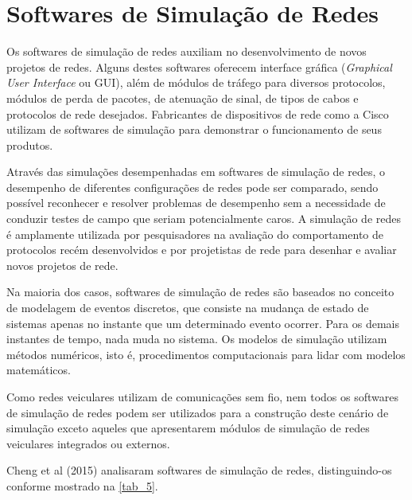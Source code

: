 \documentclass[
12pt,				%
openright,			%
oneside,			%
a4paper,			%
brazil,				%
]{abntex2}
\begin{document}
	\section{Softwares de Simulação de Redes}
	
	\par Os softwares de simulação de redes auxiliam no desenvolvimento de novos projetos de redes. Alguns destes softwares oferecem interface gráfica  (\textit{Graphical User Interface} ou  GUI), além de módulos de tráfego para diversos protocolos, módulos de perda de pacotes, de atenuação de sinal, de tipos de cabos e protocolos de rede desejados. Fabricantes de dispositivos de rede como a Cisco utilizam de softwares de simulação para demonstrar o funcionamento de seus produtos.
	
	\par Através das simulações desempenhadas em softwares de simulação de redes, o desempenho de diferentes configurações de redes pode ser comparado, sendo possível reconhecer e resolver problemas de desempenho sem a necessidade de conduzir testes de campo que seriam potencialmente caros. A simulação de redes é amplamente utilizada por pesquisadores na avaliação do comportamento de protocolos recém desenvolvidos e por projetistas de rede para desenhar e avaliar novos projetos de rede.

	\par Na maioria dos casos, softwares de simulação de redes são baseados no conceito de modelagem de eventos discretos, que consiste na mudança de estado de sistemas apenas no instante que um determinado evento ocorrer. Para os demais instantes de tempo, nada muda no sistema. Os modelos de simulação utilizam métodos numéricos, isto é, procedimentos computacionais para lidar com modelos matemáticos.
	
	\par Como redes veiculares utilizam de comunicações sem fio, nem todos os softwares de simulação de redes podem ser utilizados para a construção deste cenário de simulação exceto aqueles que apresentarem módulos de simulação de redes veiculares integrados ou externos.
	
	\par Cheng et al (2015) analisaram softwares de simulação de redes, distinguindo-os conforme mostrado na \autoref{tab_5}. 
	
\end{document}
